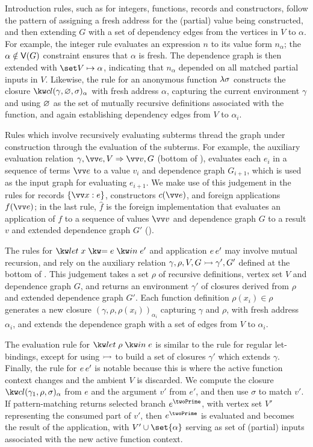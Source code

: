 Introduction rules, such as for integers, functions, records and constructors, follow the pattern of
assigning a fresh address for the (partial) value being constructed, and then extending $G$ with a set of
dependency edges from the vertices in $V$ to $\alpha$. For example, the integer rule evaluates an expression
$n$ to its value form $n_{\alpha}$; the $\alpha \notin \textup{\textsf{V}}(G)$ constraint ensures that $\alpha$ is fresh. The
dependence graph is then extended with $\inStar{V}{\alpha}$, indicating that $n_\alpha$ depended on all
matched partial inputs in $V$. Likewise, the rule for an anonymous function $\lambda{\sigma}$ constructs the
closure $\exClosure{\gamma}{\envEmpty}{\sigma}_\alpha$ with fresh address $\alpha$, capturing the current
environment $\gamma$ and using $\varnothing$ as the set of mutually recursive definitions associated with the
function, and again establishing dependency edges from $V$ to $\alpha_i$.

Rules which involve recursively evaluating subterms thread the graph under construction through the evaluation
of the subterms. For example, the auxiliary evaluation relation $\gamma, \seq{e}, V \evalS \seq{v}, G$ (bottom
of ), evaluates each $e_i$ in a sequence of terms $\seq{e}$ to a value $v_i$ and dependence
graph $G_{i + 1}$, which is used as the input graph for evaluating $e_{i + 1}$. We make use of this judgement
in the rules for records $\exRec{\seq{\bind{x}{e}}}$, constructors $c(\seq{e})$, and foreign applications
$f(\seq{e})$; in the last rule, $\hat{f}$ is the foreign implementation that evaluates an application of $f$
to a sequence of values $\seq{v}$ and dependence graph $G$ to a result $v$ and extended dependence graph $G'$
().

The rules for $\exLet{x}{e}{e'}$ and application ${e}\,{e'}$ may involve mutual recursion, and rely on the
auxiliary relation $\gamma, \rho, V, G \rightarrowtail \gamma', G'$  defined at the bottom of .
This judgement takes a set $\rho$ of recursive definitions, vertex set $V$ and dependence graph $G$, and
returns an environment $\gamma'$ of closures derived from $\rho$ and extended dependence graph $G'$. Each
function definition $\rho(x_i) \in \rho$ generates a new closure $(\gamma, \rho, \rho(x_i))_{\alpha_i}$
capturing $\gamma$ and $\rho$, with fresh address ${\alpha_i}$, and extends the dependence graph with a set of
edges from $V$ to $\alpha_i$.

The evaluation rule for $\exLetRec{\rho}{e}$ is similar to the rule for regular let-bindings, except for using
$\rightarrowtail$ to build a set of closures $\gamma'$ which extends $\gamma$. Finally, the rule for
${e}\,{e'}$ is notable because this is where the active function context changes and the ambient $V$ is
discarded. We compute the closure $\annClosure{\gamma_1}{\rho}{\sigma}{\alpha}$ from $e$ and the argument $v'$
from $e'$, and then use $\sigma$ to match $v'$. If pattern-matching returns selected branch $e^\twoPrime$,
with vertex set $V'$ representing the consumed part of $v'$, then $e^\twoPrime$ is evaluated and becomes the
result of the application, with $V' \cup \set{\alpha}$ serving as set of (partial) inputs associated with the
new active function context.

